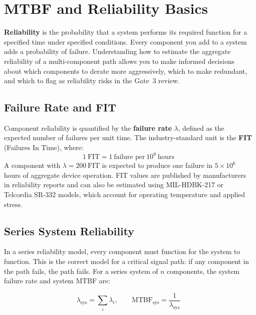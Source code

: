 \section{MTBF and Reliability Basics}
\label{sec:ch6-mtbf}

\textbf{Reliability} is the probability that a system performs its required function for a specified time under specified conditions.
Every component you add to a system adds a probability of failure.
Understanding how to estimate the aggregate reliability of a multi-component path allows you to make informed decisions about which components to derate more aggressively, which to make redundant, and which to flag as reliability risks in the Gate~3 review.

\subsection{Failure Rate and FIT}
\label{sec:ch6-fit}

Component reliability is quantified by the \textbf{failure rate} $\lambda$, defined as the expected number of failures per unit time.
The industry-standard unit is the \textbf{FIT} (Failures In Time), where:
\[
  1~\mathrm{FIT} = 1~\text{failure per}~10^{9}~\text{hours}
\]
A component with $\lambda = 200~\mathrm{FIT}$ is expected to produce one failure in $5 \times 10^6$ hours of aggregate device operation.
FIT values are published by manufacturers in reliability reports and can also be estimated using MIL-HDBK-217 or Telcordia SR-332 models, which account for operating temperature and applied stress.

\subsection{Series System Reliability}
\label{sec:ch6-series}

In a series reliability model, every component must function for the system to function.
This is the correct model for a critical signal path: if any component in the path fails, the path fails.
For a series system of $n$ components, the system failure rate and system MTBF are:

\begin{equation}\label{eq:ch6-lambda-sys}
  \lambda_{\text{sys}} = \sum_i \lambda_i, \qquad \mathrm{MTBF}_{\text{sys}} = \frac{1}{\lambda_{\text{sys}}}
\end{equation}

